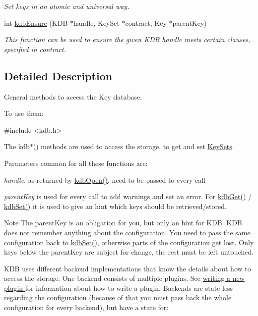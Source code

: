 \begin{DoxyCompactItemize}
\begin{DoxyCompactList}\small\item\em Set keys in an atomic and universal way. \end{DoxyCompactList}\item 
int \hyperlink{group__kdb_ga0955373877575fa21275891518f8ab31}{kdb\+Ensure} (K\+DB $\ast$handle, Key\+Set $\ast$contract, Key $\ast$parent\+Key)
\begin{DoxyCompactList}\small\item\em This function can be used to ensure the given K\+DB {\ttfamily handle} meets certain clauses, specified in {\ttfamily contract}. \end{DoxyCompactList}\end{DoxyCompactItemize}


\subsection{Detailed Description}
General methods to access the Key database. 

To use them\+: 
\begin{DoxyCode}
\textcolor{preprocessor}{#include <kdb.h>}
\end{DoxyCode}


The kdb$\ast$() methods are used to access the storage, to get and set \hyperlink{group__keyset}{Key\+Sets}.

Parameters common for all these functions are\+:


\begin{DoxyItemize}
\item {\itshape handle}, as returned by \hyperlink{group__kdb_ga6808defe5870f328dd17910aacbdc6ca}{kdb\+Open()}, need to be passed to every call
\item {\itshape parent\+Key} is used for every call to add warnings and set an error. For \hyperlink{group__kdb_ga28e385fd9cb7ccfe0b2f1ed2f62453a1}{kdb\+Get()} / \hyperlink{group__kdb_ga11436b058408f83d303ca5e996832bcf}{kdb\+Set()} it is used to give an hint which keys should be retrieved/stored.
\end{DoxyItemize}

\begin{DoxyNote}{Note}
The parent\+Key is an obligation for you, but only an hint for K\+DB. K\+DB does not remember anything about the configuration. You need to pass the same configuration back to \hyperlink{group__kdb_ga11436b058408f83d303ca5e996832bcf}{kdb\+Set()}, otherwise parts of the configuration get lost. Only keys below the parent\+Key are subject for change, the rest must be left untouched.
\end{DoxyNote}
K\+DB uses different backend implementations that know the details about how to access the storage. One backend consists of multiple plugins. See \hyperlink{group__plugin}{writing a new plugin } for information about how to write a plugin. Backends are state-\/less regarding the configuration (because of that you must pass back the whole configuration for every backend), but have a state for\+:


